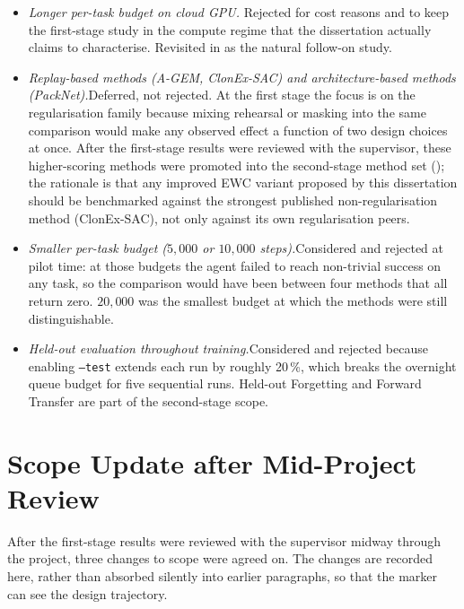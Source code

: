 \begin{itemize}
    \item \emph{Longer per-task budget on cloud GPU.}\quad
        Rejected for cost reasons and to keep the first-stage
        study in the compute regime that the dissertation
        actually claims to characterise. Revisited in
         as the natural follow-on study.
    \item \emph{Replay-based methods (A-GEM, ClonEx-SAC) and
        architecture-based methods (PackNet).}\quad Deferred,
        not rejected. At the first stage the focus is on the
        regularisation family because mixing rehearsal or
        masking into the same comparison would make any
        observed effect a function of two design choices at
        once. After the first-stage results were reviewed with
        the supervisor, these higher-scoring methods were
        promoted into the second-stage method set
        (); the rationale is that any
        improved EWC variant proposed by this dissertation
        should be benchmarked against the strongest published
        non-regularisation method (ClonEx-SAC), not only
        against its own regularisation peers.
    \item \emph{Smaller per-task budget ($5{,}000$ or
        $10{,}000$ steps).}\quad Considered and rejected at
        pilot time: at those budgets the agent failed to reach
        non-trivial success on any task, so the comparison
        would have been between four methods that all return
        zero. $20{,}000$ was the smallest budget at which the
        methods were still distinguishable.
    \item \emph{Held-out evaluation throughout
        training.}\quad Considered and rejected because enabling
        \texttt{--test} extends each run by roughly 20\,\%,
        which breaks the overnight queue budget for five
        sequential runs. Held-out Forgetting and Forward
        Transfer are part of the second-stage scope.
\end{itemize}

\section{Scope Update after Mid-Project Review}
\label{sec:scope_update}

After the first-stage results were reviewed with the supervisor
midway through the project, three changes to scope were agreed
on. The changes are recorded here, rather than absorbed silently
into earlier paragraphs, so that the marker can see the design
trajectory.

